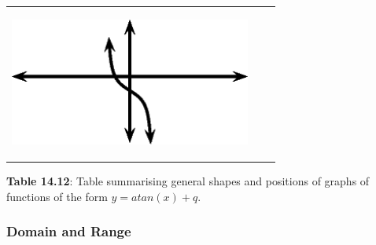 \begin{center}
\begin{xtabular*}{\mytablewidth}[t]{|p{10\mystarwidth}|p{10\mystarwidth}|p{10\mystarwidth}|}
                  
    \setcounter{subfigure}{0}

\label{m39414*id91042}
    \begin{center}
    \label{m39414*id91042!!!underscore!!!media}\label{m39414*id91042!!!underscore!!!printimage}\includegraphics[width=300px]{col11306.imgs/m39414_MG10C15_037.png} %
        
      \vspace{2pt}
    \vspace{.1in}
    
    \end{center}



    \addtocounter{footnote}{-0}
    
     \tabularnewline{}
    \end{xtabular*}
      \end{center}
    \begin{center}{\small\bfseries Table 14.12}: Table summarising general shapes and positions of graphs of functions of the form \begin{math}y=atan\left(x\right)+q\end{math}.\end{center}
    
    \addtocounter{footnote}{-0}
    
    \par
  
        \label{m39414*uid87}
            \subsubsection{ Domain and Range}
            \nopagebreak
            
